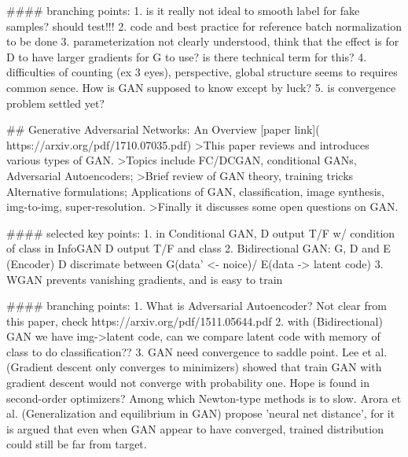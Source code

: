 #### branching points:
1. is it really not ideal to smooth label for fake samples? should test!!!
2. code and best practice for reference batch normalization to be done
3. parameterization not clearly understood, think that the effect is for D to have larger gradients for G to use? is there technical term for this?
4. difficulties of counting (ex 3 eyes), perspective, global structure seems to requires common sence. How is GAN supposed to know except by luck?
5. is convergence problem settled yet?



## Generative Adversarial Networks: An Overview 
[paper link]( https://arxiv.org/pdf/1710.07035.pdf)
>This paper reviews and introduces various types of GAN.
>Topics include FC/DCGAN, conditional GANs, Adversarial Autoencoders; 
>Brief review of GAN theory, training tricks Alternative formulations; Applications of GAN, classification, image synthesis, img-to-img, super-resolution. 
>Finally it discusses some open questions on GAN. 

#### selected key points:
1.  in Conditional GAN, D output T/F w/ condition of class
in InfoGAN D output T/F and class
2. Bidirectional GAN: G, D and E (Encoder)
    D discrimate between G(data' <- noice)/ E(data -> latent code)
3. WGAN prevents vanishing gradients, and is easy to train

#### branching points:
1. What is Adversarial Autoencoder? Not clear from this paper, check https://arxiv.org/pdf/1511.05644.pdf
2. with (Bidirectional) GAN we have img->latent code, can we compare latent code with memory of class to do classification??
3. GAN need convergence to saddle point. Lee et al. (Gradient descent only converges to minimizers) showed that train GAN with gradient descent would not converge with probability one. Hope is found in second-order optimizers? Among which Newton-type methods is to slow. Arora et al. (Generalization and equilibrium in GAN) propose 'neural net distance', for it is argued that even when GAN appear to have converged, trained distribution could still be far from target.